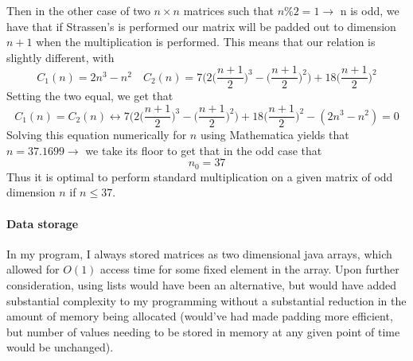 \documentclass[10pt,letter]{article}
\begin{document}
Then in the other case of two $n\times n$ matrices such that $n \% 2 = 1 \rightarrow $ n is odd, we have that if Strassen's is performed our matrix will be padded out to dimension $n+1$ when the multiplication is performed. This means that our relation is slightly different, with
$$C_1(n) = 2n^3-n^2 \quad C_2(n) = 7\big(2\big(\frac{n+1}{2}\big)^3-\big(\frac{n+1}{2}\big)^2\big) + 18\big(\frac{n+1}{2}\big)^2$$
Setting the two equal, we get that
$$C_1(n) = C_2(n) \leftrightarrow 7\big(2\big(\frac{n+1}{2}\big)^3-\big(\frac{n+1}{2}\big)^2\big) + 18\big(\frac{n+1}{2}\big)^2 - ( 2n^3-n^2) = 0$$ Solving this equation numerically for $n$ using Mathematica yields that $n = 37.1699 \rightarrow$ we take its floor to get that in the odd case that $$\boxed{n_0} = 37$$ 
Thus it is optimal to perform standard multiplication on a given matrix of odd dimension $n$ if $n \le 37$. 


\paragraph{Data storage} In my program, I always stored matrices as two dimensional java arrays, which allowed for $O(1)$ access time for some fixed element in the array. Upon further consideration, using lists would have been an alternative, but would have added substantial complexity to my programming without a substantial reduction in the amount of memory being allocated (would've had made padding more efficient, but number of values needing to be stored in memory at any given point of time would be unchanged).
\end{document}
